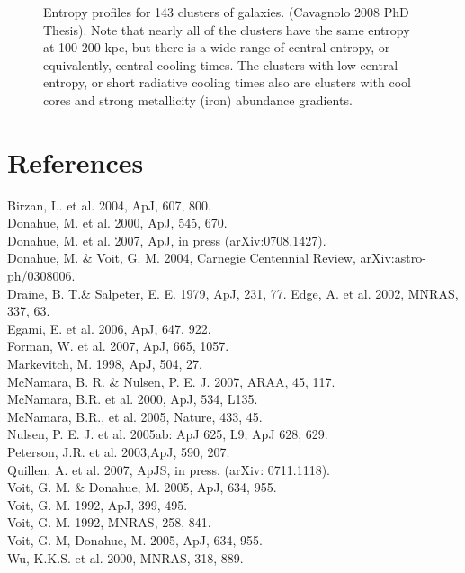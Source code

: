 \documentclass[letterpaper,12pt]{article}
\begin{document}
\begin{figure}[t]
\begin{minipage}[t]{0.5\linewidth}
        \caption{\small Entropy profiles for 143 clusters of galaxies. (Cavagnolo 2008
        PhD Thesis). Note that nearly all of the clusters have the same entropy at 
        100-200 kpc, but there is a wide range of central entropy, or equivalently,
        central cooling times. The clusters with low central entropy, or short 
        radiative cooling times also are clusters with cool cores and strong 
        metallicity (iron) abundance gradients.}
        \label{fig:figure4}
    \end{minipage}
\end{figure}

\clearpage
\section{References}
Birzan, L. et al. 2004, ApJ, 607, 800. \\
Donahue, M. et al. 2000, ApJ, 545, 670. \\
Donahue, M. et al. 2007, ApJ, in press (arXiv:0708.1427). \\
Donahue, M. \& Voit, G. M. 2004, Carnegie Centennial Review, arXiv:astro-ph/0308006. \\
Draine, B. T.\& Salpeter, E. E. 1979, ApJ, 231, 77.
Edge, A. et al. 2002, MNRAS, 337, 63. \\
Egami, E. et al. 2006, ApJ, 647, 922. \\
Forman, W. et al. 2007, ApJ, 665, 1057. \\
Markevitch, M. 1998, ApJ, 504, 27. \\
McNamara, B. R. \& Nulsen, P. E. J. 2007, ARAA, 45, 117.\\
McNamara, B.R. et al. 2000, ApJ, 534, L135. \\
McNamara, B.R., et al. 2005, {Nature}, 433, 45. \\
Nulsen, P. E. J. et al. 2005ab: ApJ 625, L9; ApJ 628, 629.\\
Peterson, J.R. et al. 2003,ApJ, 590, 207. \\
Quillen, A. et al. 2007, ApJS, in press. (arXiv: 0711.1118). \\
Voit, G. M. \& Donahue, M. 2005, ApJ, 634, 955. \\
Voit, G. M. 1992, ApJ, 399, 495.\\
Voit, G. M. 1992, MNRAS, 258, 841.\\
Voit, G. M, Donahue, M. 2005, ApJ, 634, 955. \\
Wu, K.K.S. et al. 2000, MNRAS, 318, 889. \\
\end{document}
